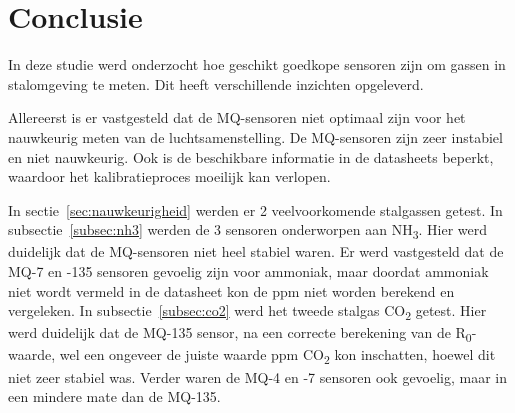 
\chapter{Conclusie}%
\label{ch:conclusie}




In deze studie werd onderzocht hoe geschikt goedkope sensoren zijn om gassen in stalomgeving te meten. Dit heeft verschillende inzichten opgeleverd.

Allereerst is er vastgesteld dat de MQ-sensoren niet optimaal zijn voor het nauwkeurig meten van de luchtsamenstelling. De MQ-sensoren zijn zeer instabiel en niet nauwkeurig. Ook is de beschikbare informatie in de datasheets beperkt, waardoor het kalibratieproces moeilijk kan verlopen.

In sectie~\ref{sec:nauwkeurigheid} werden er 2 veelvoorkomende stalgassen getest.
In subsectie~\ref{subsec:nh3} werden de 3 sensoren onderworpen aan NH\textsubscript{3}. Hier werd duidelijk dat de MQ-sensoren niet heel stabiel waren. Er werd vastgesteld dat de MQ-7 en -135 sensoren gevoelig zijn voor ammoniak, maar doordat ammoniak niet wordt vermeld in de datasheet kon de ppm niet worden berekend en vergeleken.
In subsectie~\ref{subsec:co2} werd het tweede stalgas CO\textsubscript{2} getest. Hier werd duidelijk dat de MQ-135 sensor, na een correcte berekening van de R\textsubscript{0}-waarde, wel een ongeveer de juiste waarde ppm CO\textsubscript{2} kon inschatten, hoewel dit niet zeer stabiel was. Verder waren de MQ-4 en -7 sensoren ook gevoelig, maar in een mindere mate dan de MQ-135.

